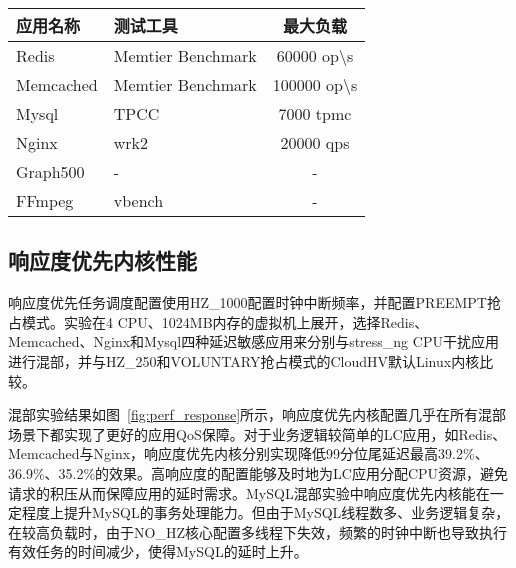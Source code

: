 \begin{table}[H]
    \label{tab:app_work}
    \footnotesize%
    \setlength{\tabcolsep}{8pt}%
    \renewcommand{\arraystretch}{1.25}%
    \centering
    \begin{tabular}{llc}
        \hline
        应用名称 & 测试工具 & 最大负载 \\
        \hline
        Redis     & Memtier Benchmark & 60000 op\textbackslash s \\
        Memcached & Memtier Benchmark & 100000 op\textbackslash s \\
        Mysql     & TPCC              & 7000  tpmc \\
        Nginx     & wrk2              & 20000 qps \\
        Graph500  & -                 & - \\
        FFmpeg    & vbench            & - \\
        \hline
    \end{tabular}
\end{table}

\subsection{响应度优先内核性能}

响应度优先任务调度配置使用HZ\_1000配置时钟中断频率，并配置PREEMPT抢占模式。实验在4 CPU、1024MB内存的虚拟机上展开，选择Redis、Memcached、Nginx和Mysql四种延迟敏感应用来分别与stress\_ng CPU干扰应用进行混部，并与HZ\_250和VOLUNTARY抢占模式的CloudHV默认Linux内核比较。

混部实验结果如图~\ref{fig:perf_response}所示，响应度优先内核配置几乎在所有混部场景下都实现了更好的应用QoS保障。对于业务逻辑较简单的LC应用，如Redis、Memcached与Nginx，响应度优先内核分别实现降低99分位尾延迟最高39.2\%、36.9\%、35.2\%的效果。高响应度的配置能够及时地为LC应用分配CPU资源，避免请求的积压从而保障应用的延时需求。MySQL混部实验中响应度优先内核能在一定程度上提升MySQL的事务处理能力。但由于MySQL线程数多、业务逻辑复杂，在较高负载时，由于NO\_HZ核心配置多线程下失效，频繁的时钟中断也导致执行有效任务的时间减少，使得MySQL的延时上升。

